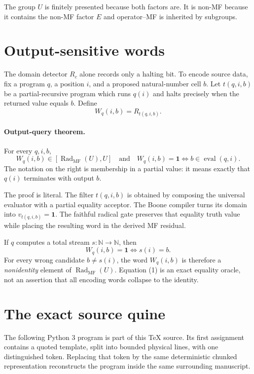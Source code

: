 \documentclass[11pt]{article}
\newcommand{\RadMF}{\operatorname{Rad}_{\mathrm{MF}}}
\newcommand{\one}{\mathbf 1}
\begin{document}
The group $U$ is finitely presented because both factors are.  It is non-MF
because it contains the non-MF factor $E$ and operator--MF is inherited by
subgroups.

\section{Output-sensitive words}

The domain detector $R_c$ alone records only a halting bit.  To encode source
data, fix a program $q$, a position $i$, and a proposed natural-number cell
$b$.  Let $t(q,i,b)$ be a partial-recursive program which runs $q(i)$ and
halts precisely when the returned value equals $b$.  Define
\[
 W_q(i,b)=R_{t(q,i,b)}.
\]

\paragraph{Output-query theorem.}
For every $q,i,b$,
\[
 W_q(i,b)\in[\RadMF(U),U]
 \quad\text{and}\quad
 W_q(i,b)=\one\Longleftrightarrow b\in\operatorname{eval}(q,i).
\]
The notation on the right is membership in a partial value: it means exactly
that $q(i)$ terminates with output $b$.

The proof is literal.  The filter $t(q,i,b)$ is obtained by composing the
universal evaluator with a partial equality acceptor.  The Boone compiler
turns its domain into $v_{t(q,i,b)}=\one$.  The faithful radical gate preserves
that equality truth value while placing the resulting word in the derived
MF residual.

If $q$ computes a total stream $s:\mathbb N\to\mathbb N$, then
\[
 W_q(i,b)=\one\Longleftrightarrow s(i)=b.                 \tag{1}
\]
For every wrong candidate $b\ne s(i)$, the word $W_q(i,b)$ is therefore a
\emph{nonidentity} element of $\RadMF(U)$.  Equation (1) is an exact equality
oracle, not an assertion that all encoding words collapse to the identity.

\section{The exact source quine}

The following Python 3 program is part of this TeX source.  Its first
assignment contains a quoted template, split into bounded physical lines, with
one distinguished token.  Replacing that token by the same deterministic
chunked representation reconstructs the program inside the same surrounding
manuscript.
\end{document}
